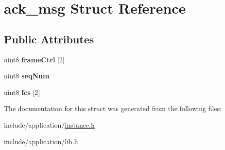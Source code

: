 \hypertarget{structack__msg}{\section{ack\-\_\-msg Struct Reference}
\label{structack__msg}
}
\subsection*{Public Attributes}
\begin{DoxyCompactItemize}
\item 
\hypertarget{structack__msg_af4a2eacb507f14f553cc3ffcbdacaa52}{uint8 {\bfseries frame\-Ctrl} \mbox{[}2\mbox{]}}\label{structack__msg_af4a2eacb507f14f553cc3ffcbdacaa52}

\item 
\hypertarget{structack__msg_aad4214af64b3e581090764865be79b3e}{uint8 {\bfseries seq\-Num}}\label{structack__msg_aad4214af64b3e581090764865be79b3e}

\item 
\hypertarget{structack__msg_a058ffc2345e85ebab96312f0c9f0531b}{uint8 {\bfseries fcs} \mbox{[}2\mbox{]}}\label{structack__msg_a058ffc2345e85ebab96312f0c9f0531b}

\end{DoxyCompactItemize}


The documentation for this struct was generated from the following files\-:\begin{DoxyCompactItemize}
\item 
include/application/\hyperlink{instance_8h}{instance.\-h}\item 
include/application/lib.\-h\end{DoxyCompactItemize}
